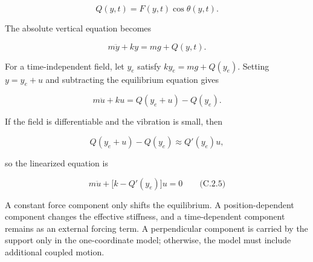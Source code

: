 \[
Q(y,t)=F(y,t)\cos\theta(y,t).
\]

The absolute vertical equation becomes

\[
m\ddot{y}+ky=mg+Q(y,t).
\]

For a time-independent field, let \(y_e\) satisfy \(ky_e=mg+Q(y_e)\). Setting \(y=y_e+u\) and subtracting the equilibrium equation gives

\[
m\ddot{u}+ku=Q(y_e+u)-Q(y_e).
\]

If the field is differentiable and the vibration is small, then

\[
Q(y_e+u)-Q(y_e)\approx Q'(y_e)u,
\]

so the linearized equation is

\[
\boxed{m\ddot{u}+\bigl[k-Q'(y_e)\bigr]u=0}
\qquad\text{(C.2.5)}
\]

A constant force component only shifts the equilibrium. A position-dependent component changes the effective stiffness, and a time-dependent component remains as an external forcing term. A perpendicular component is carried by the support only in the one-coordinate model; otherwise, the model must include additional coupled motion.

\endgroup
